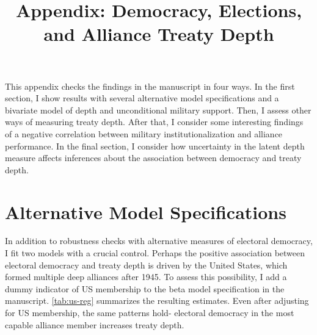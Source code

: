 \documentclass[12pt]{article}
\title{\textbf{Appendix: Democracy, Elections, and Alliance Treaty Depth}}
\author{}
\date{}
\begin{document}
\maketitle 

\doublespace 

This appendix checks the findings in the manuscript in four ways. 
In the first section, I show results with several alternative model specifications and a bivariate model of depth and unconditional military support.
Then, I assess other ways of measuring treaty depth. 
After that, I consider some interesting findings of a negative correlation between military institutionalization and alliance performance. 
In the final section, I consider how uncertainty in the latent depth measure affects inferences about the association between democracy and treaty depth. 


\section{Alternative Model Specifications} 


In addition to robustness checks with alternative measures of electoral democracy, I fit two models with a crucial control. 
Perhaps the positive association between electoral democracy and treaty depth is driven by the United States, which formed multiple deep alliances after 1945. 
To assess this possibility, I add a dummy indicator of US membership to the beta model specification in the manuscript. 
\autoref{tab:us-reg} summarizes the resulting estimates. 
Even after adjusting for US membership, the same patterns hold- electoral democracy in the most capable alliance member increases treaty depth. 
 
\end{document}
